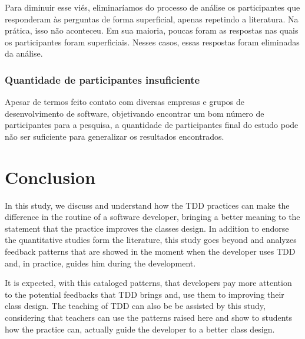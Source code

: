 \documentclass[conference]{IEEEtran}
\begin{document}
Para diminuir esse viés, eliminaríamos do processo de análise os participantes
que responderam às perguntas de forma superficial, apenas repetindo a literatura. Na prática,
isso não aconteceu. Em sua maioria, poucas foram as respostas nas quais os participantes
foram superficiais. Nesses casos, essas respostas foram eliminadas da análise.

\subsubsection{Quantidade de participantes insuficiente}

Apesar de termos feito contato
com diversas empresas e grupos de desenvolvimento de software,
objetivando encontrar um bom número de participantes para a pesquisa,
a quantidade de participantes final do estudo pode não ser suficiente para generalizar
os resultados encontrados. 

\section{Conclusion}


In this study, we discuss and understand how the TDD practices can make the
difference in the routine of a software developer, bringing a better meaning
to the statement that the practice improves the classes design.
In addition to endorse the quantitative studies form the literature, this study
goes beyond and analyzes feedback patterns that are showed in the moment when
the developer uses TDD and, in practice, guides him during the development.


It is expected, with this cataloged patterns, that developers pay more attention
to the potential feedbacks that TDD brings and, use them to improving their class
design. The teaching of TDD can also be be assisted by this study, considering
that teachers can use the patterns raised here and show to students
how the practice can, actually guide the developer to a better class design.
\end{document}
